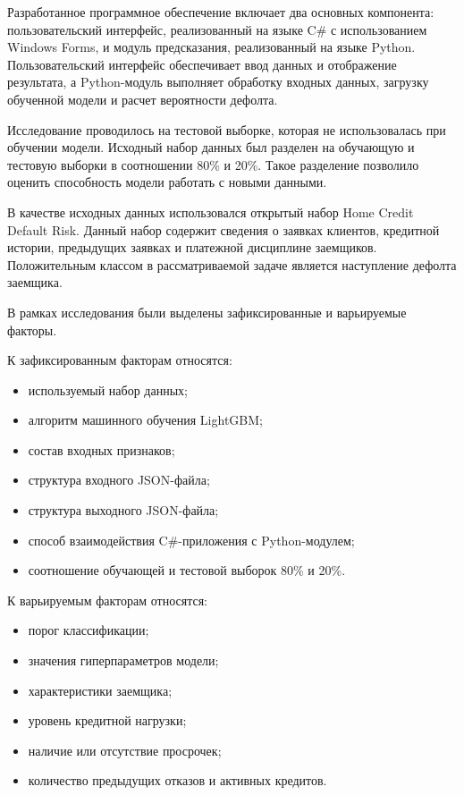 Разработанное программное обеспечение включает два основных компонента: пользовательский интерфейс, реализованный на языке C\# с использованием Windows Forms, и модуль предсказания, реализованный на языке Python. Пользовательский интерфейс обеспечивает ввод данных и отображение результата, а Python-модуль выполняет обработку входных данных, загрузку обученной модели и расчет вероятности дефолта.

Исследование проводилось на тестовой выборке, которая не использовалась при обучении модели. Исходный набор данных был разделен на обучающую и тестовую выборки в соотношении 80\% и 20\%. Такое разделение позволило оценить способность модели работать с новыми данными.

В качестве исходных данных использовался открытый набор Home Credit Default Risk. Данный набор содержит сведения о заявках клиентов, кредитной истории, предыдущих заявках и платежной дисциплине заемщиков. Положительным классом в рассматриваемой задаче является наступление дефолта заемщика.

В рамках исследования были выделены зафиксированные и варьируемые факторы.

К зафиксированным факторам относятся:

\begin{itemize}
    \item используемый набор данных;
    \item алгоритм машинного обучения LightGBM;
    \item состав входных признаков;
    \item структура входного JSON-файла;
    \item структура выходного JSON-файла;
    \item способ взаимодействия C\#-приложения с Python-модулем;
    \item соотношение обучающей и тестовой выборок 80\% и 20\%.
\end{itemize}

К варьируемым факторам относятся:

\begin{itemize}
    \item порог классификации;
    \item значения гиперпараметров модели;
    \item характеристики заемщика;
    \item уровень кредитной нагрузки;
    \item наличие или отсутствие просрочек;
    \item количество предыдущих отказов и активных кредитов.
\end{itemize}

